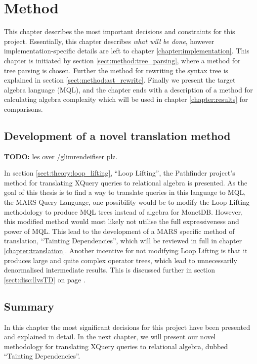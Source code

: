 \chapter{Method}
\label{chapter:method}
This chapter describes the most important decisions and constraints for this
project. Essentially, this chapter describes \emph{what will be done}, however
implementation-specific details are left to chapter
\ref{chapter:implementation}. This chapter is initiated by section
\ref{sect:method:tree_parsing}, where a method for tree parsing is chosen.
Further the method for rewriting the syntax tree is explained in section
\ref{sect:method:ast_rewrite}. Finally we present the target algebra language
(MQL), and the chapter ends with a description of a method for calculating
algebra complexity which will be used in chapter \ref{chapter:results} for
comparisons.

\section{Development of a novel translation method}
\textbf{\LARGE TODO:} les over /glimrendeifiser plz.

In section \ref{sect:theory:loop_lifting}, ``Loop Lifting'', the Pathfinder
project's method for translating XQuery queries to relational algebra is
presented. As the goal of this thesis is to find a way to translate queries in
this language to MQL, the MARS Query Language, one possibility would be to
modify the Loop Lifting methodology to produce MQL trees instead of algebra for
MonetDB. However, this modified method would most likely not utilise the full
expressiveness and power of MQL. This lead to the development of a MARS
specific method of translation, ``Tainting Dependencies'', which will be
reviewed in full in chapter \ref{chapter:translation}. Another incentive for
not modifying Loop Lifting is that it produces large and quite complex
operator trees, which lead to unnecessarily denormalised intermediate results.
This is discussed further in section \ref{sect:disc:llvsTD} on page
\pageref{sect:disc:llvsTD}.







\section{Summary}
\label{sect:method:summary}
In this chapter the most significant decisions for this project have been
presented and explained in detail. In the next chapter, we will present our
novel methodology for translating XQuery queries to relational algebra, dubbed
``Tainting Dependencies''.
